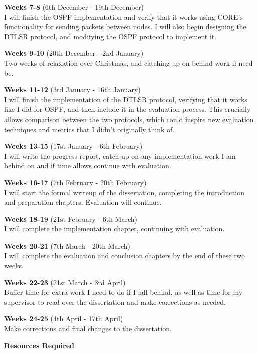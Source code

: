 \documentclass[withindex,glossary,openany]{cam-thesis}
\begin{document}
\large\textbf{Weeks 7-8} (6th December - 19th December)\normalsize\\
I will finish the OSPF implementation and verify that it works using CORE’s functionality for sending packets between nodes. I will also begin designing the DTLSR protocol, and modifying the OSPF protocol to implement it.

\large\textbf{Weeks 9-10} (20th December - 2nd January)\normalsize\\
Two weeks of relaxation over Christmas, and catching up on behind work if need be.

\large\textbf{Weeks 11-12} (3rd January - 16th January)\normalsize\\
I will finish the implementation of the DTLSR protocol, verifying that it works like I did for OSPF, and then include it in the evaluation process. This crucially allows comparison between the two protocols, which could inspire new evaluation techniques and metrics that I didn’t originally think of.

\large\textbf{Weeks 13-15} (17st January - 6th February)\normalsize\\
I will write the progress report, catch up on any implementation work I am behind on and if time allows continue with evaluation.

\large\textbf{Weeks 16-17} (7th February - 20th February)\normalsize\\
I will start the formal writeup of the dissertation, completing the introduction and preparation chapters. Evaluation will continue.

\large\textbf{Weeks 18-19} (21st February - 6th March)\normalsize\\
I will complete the implementation chapter, continuing with evaluation.

\large\textbf{Weeks 20-21} (7th March - 20th March)\normalsize\\
I will complete the evaluation and conclusion chapters by the end of these two weeks.

\large\textbf{Weeks 22-23} (21st March - 3rd April)\normalsize\\
Buffer time for extra work I need to do if I fall behind, as well as time for my supervisor to read over the dissertation and make corrections as needed.

\large\textbf{Weeks 24-25} (4th April - 17th April)\normalsize\\
Make corrections and final changes to the dissertation.

\vspace{8mm}
\LARGE\textbf{Resources Required}\normalsize
\end{document}
